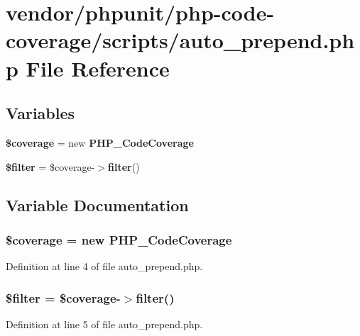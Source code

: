 \section{vendor/phpunit/php-\/code-\/coverage/scripts/auto\+\_\+prepend.php File Reference}
\label{auto__prepend_8php}
\subsection*{Variables}
\begin{DoxyCompactItemize}
\item 
{\bf \$coverage} = new {\bf P\+H\+P\+\_\+\+Code\+Coverage}
\item 
{\bf \$filter} = \$coverage-\/$>${\bf filter}()
\end{DoxyCompactItemize}


\subsection{Variable Documentation}
\subsubsection[{\$coverage}]{\setlength{\rightskip}{0pt plus 5cm}\$coverage = new {\bf P\+H\+P\+\_\+\+Code\+Coverage}}\label{auto__prepend_8php_a73283c119d0518c227dc341a79a8da3b}


Definition at line 4 of file auto\+\_\+prepend.\+php.

\subsubsection[{\$filter}]{\setlength{\rightskip}{0pt plus 5cm}\${\bf filter} = \$coverage-\/$>${\bf filter}()}\label{auto__prepend_8php_aac53bdb48bdd96ff9c20e2a86f48ce5f}


Definition at line 5 of file auto\+\_\+prepend.\+php.


